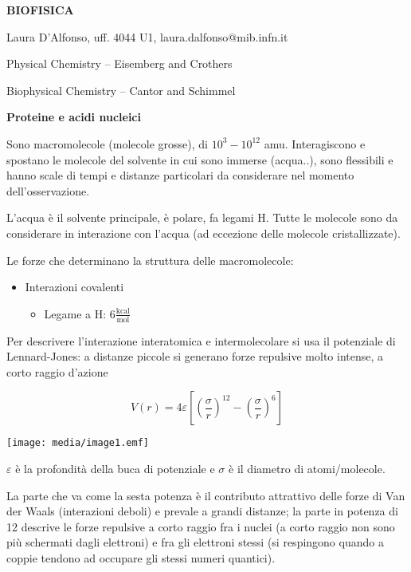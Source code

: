 



\textbf{BIOFISICA}

Laura D'Alfonso, uff. 4044 U1, laura.dalfonso@mib.infn.it

Physical Chemistry -- Eisemberg and Crothers

Biophysical Chemistry -- Cantor and Schimmel

\textbf{Proteine e acidi nucleici}

Sono macromolecole (molecole grosse), di \(10^{3} - 10^{12}\) amu.
Interagiscono e spostano le molecole del solvente in cui sono immerse
(acqua..), sono flessibili e hanno scale di tempi e distanze particolari
da considerare nel momento dell'osservazione.

L'acqua è il solvente principale, è polare, fa legami H. Tutte le
molecole sono da considerare in interazione con l'acqua (ad eccezione
delle molecole cristallizzate).

Le forze che determinano la struttura delle macromolecole:

\begin{itemize}
\item
  Interazioni covalenti

  \begin{itemize}
  \item
    Legame a H: \(6\frac{\text{kcal}}{\text{mol}}\)
  \end{itemize}
\end{itemize}

Per descrivere l'interazione interatomica e intermolecolare si usa il
potenziale di Lennard-Jones: a distanze piccole si generano forze
repulsive molto intense, a corto raggio d'azione

\[V\left( r \right) = 4\varepsilon\left\lbrack \left( \frac{\sigma}{r} \right)^{12} - \left( \frac{\sigma}{r} \right)^{6} \right\rbrack\]

\texttt{[image: media/image1.emf]}

\(\varepsilon\) è la profondità della buca di potenziale e \(\sigma\) è
il diametro di atomi/molecole.

La parte che va come la sesta potenza è il contributo attrattivo delle
forze di Van der Waals (interazioni deboli) e prevale a grandi distanze;
la parte in potenza di 12 descrive le forze repulsive a corto raggio fra
i nuclei (a corto raggio non sono più schermati dagli elettroni) e fra
gli elettroni stessi (si respingono quando a coppie tendono ad occupare
gli stessi numeri quantici).

